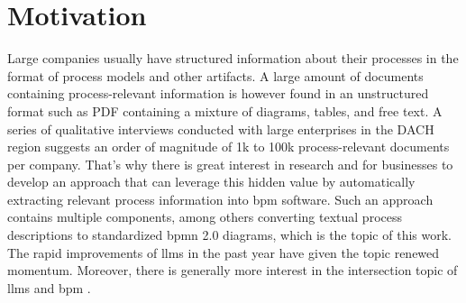 \chapter{Motivation}
Large companies usually have structured information about their processes in the format of process models and other artifacts. A large amount of documents containing process-relevant information is however found in an unstructured format such as PDF containing a mixture of diagrams, tables, and free text. A series of qualitative interviews conducted with large enterprises in the DACH region suggests an order of magnitude of 1k to 100k process-relevant documents per company. That's why there is great interest in research and for businesses to develop an approach that can leverage this hidden value by automatically extracting relevant process information into \gls{bpm} software. Such an approach contains multiple components, among others converting textual process descriptions to standardized \acs{bpmn} 2.0 diagrams, which is the topic of this work. The rapid improvements of \acsp{llm} in the past year have given the topic renewed momentum. Moreover, there is generally more interest in the intersection topic of \acsp{llm} and \acs{bpm} \cite{large-process-models}.